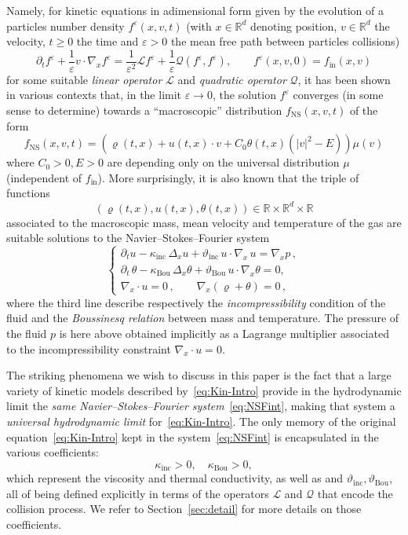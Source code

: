 \documentclass[10pt]{amsart}
\theoremstyle{definition}\newtheorem{defi}[theo]{Definition}\newtheorem{rema}[theo]{Remark}\newtheorem{exam}[theo]{Example}\newtheorem{exem}[theo]{Example}\newtheorem{nota}[theo]{Notation}
\newcommand{\ini}{\mathrm{in}}
\newcommand{\ns}{\mathrm{NS}}
\newcommand{\Inc}{\mathrm{inc}}
\newcommand{\Bou}{\mathrm{Bou}}
\newcommand{\R}{\mathbb{R}}
\newcommand{\LL}{\mathcal{L}}
\newcommand{\QQ}{\mathcal{Q}}
\renewcommand*\ge{\geqslant}
\newcommand*\eps{{\varepsilon}}
\begin{document}
Namely, for kinetic equations in adimensional form given by the evolution of a {particles number} density $f^{\eps}(x,v,t)$ {(with $x \in \R^d$ denoting position, $v \in \R^d$ the velocity, $t \ge 0$ the time and $\eps > 0$ the mean free path between particles collisions)}
\begin{equation}\label{eq:Kin-Intro}
\partial_{t}f^{\eps}+\frac{1}{\eps}v\cdot \nabla_{x}f^{\eps} =\frac{1}{\eps^{2}}\LL f^{\eps} + \frac{1}{\eps}\QQ\left(f^{\eps},f^{\eps}\right), \qquad f^{\eps}(x,v,0)=f_{\ini}(x,v)
\end{equation}
for some suitable \emph{linear operator} $\LL$ and \emph{quadratic operator} $\QQ$, it has been shown in various contexts that, in the limit $\eps \to 0$, the solution $f^{\eps}$ converges (in some sense to determine) towards a ``macroscopic'' distribution $f_{\ns}(x,v,t)$ of the form
\begin{equation}\label{eq:11}
f_{\ns}(x,v,t)= \left(\varrho(t, x) + u(t, x) \cdot v + C_{0}\theta(t, x)\left(|v|^2 - E \right)\right) \mu(v)
\end{equation}
where $C_{0} >0,E >0$ are depending {only on the universal distribution $\mu$ (independent of $f_\ini$)}. More surprisingly, it is also known that the triple of functions
\[
(\varrho(t,x),u(t,x),\theta(t,x)) \in \R \times \R^{d}\times \R
\]
{associated to} the macroscopic mass, mean velocity and temperature of the gas are suitable solutions to the Navier--Stokes--Fourier system
\begin{equation}\label{eq:NSFint}
\begin{cases}
\partial_{t}u-\kappa_{\Inc}\,\Delta_{x}u + \vartheta_{\Inc}\,u\cdot \nabla_{x}\,u = \nabla_{x}p \,,\\[6pt]
\partial_{t}\,\theta-\kappa_{\Bou}\,\Delta_{x}\theta +\vartheta_{\Bou}\,u\cdot \nabla_{x}\theta=0,\\[8pt]
\nabla_{x}\cdot u=0\,, \qquad \nabla_x\left(\varrho + \theta\right)= 0\,,
\end{cases}
\end{equation}
where the third line describe respectively the \emph{incompressibility} condition of the fluid and the \emph{Boussinesq relation} between mass and temperature. The pressure of the fluid $p$ is here above obtained implicitly as a Lagrange multiplier associated to the incompressibility constraint $\nabla_{x}\cdot u=0.$

The striking phenomena we wish to discuss in this paper is the fact that a large variety of kinetic models described by~\eqref{eq:Kin-Intro} provide in the hydrodynamic limit the \emph{same Navier--Stokes--Fourier system}~\eqref{eq:NSFint}, making that system a \emph{universal hydrodynamic limit} for~\eqref{eq:Kin-Intro}. The only memory of the original equation~\eqref{eq:Kin-Intro} kept in the system~\eqref{eq:NSFint} is encapsulated in the various coefficients:
\[
\kappa_{\Inc} >0, \quad \kappa_{\Bou} >0,
\]
which represent the viscosity and thermal conductivity, as well as and $\vartheta_\Inc,\vartheta_\Bou$, all of being defined explicitly in terms of the operators $\LL$ and $\QQ$ that encode the collision process. We refer to Section~\ref{sec:detail} for more details on those coefficients.
\end{document}
